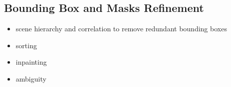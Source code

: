 




\subsection{Bounding Box and Masks Refinement }
\begin{itemize}
    \item scene hierarchy and correlation to remove redundant bounding boxes 
    \item sorting
    \item inpainting
    \item ambiguity
\end{itemize}

